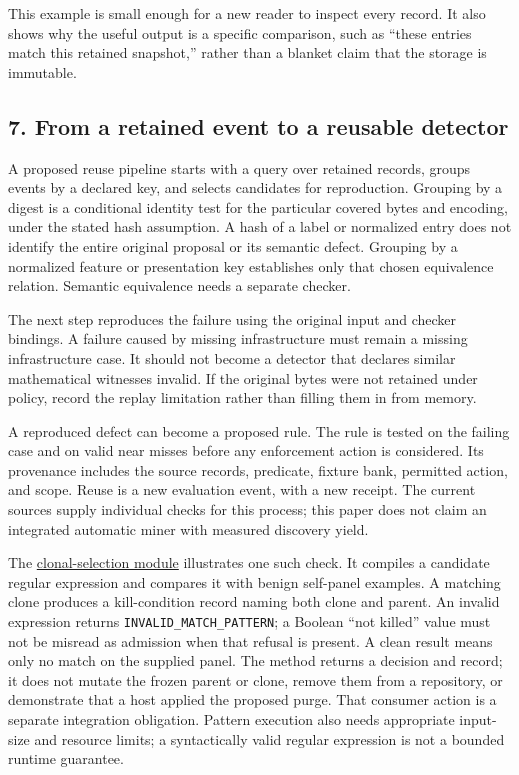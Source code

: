 \documentclass[
  11pt,
]{article}
\begin{document}
This example is small enough for a new reader to inspect every record.
It also shows why the useful output is a specific comparison, such as
``these entries match this retained snapshot,'' rather than a blanket
claim that the storage is immutable.

\hypertarget{from-a-retained-event-to-a-reusable-detector}{%
\subsection{7. From a retained event to a reusable
detector}\label{from-a-retained-event-to-a-reusable-detector}}

A proposed reuse pipeline starts with a query over retained records,
groups events by a declared key, and selects candidates for
reproduction. Grouping by a digest is a conditional identity test for
the particular covered bytes and encoding, under the stated hash
assumption. A hash of a label or normalized entry does not identify the
entire original proposal or its semantic defect. Grouping by a
normalized feature or presentation key establishes only that chosen
equivalence relation. Semantic equivalence needs a separate checker.

The next step reproduces the failure using the original input and
checker bindings. A failure caused by missing infrastructure must remain
a missing infrastructure case. It should not become a detector that
declares similar mathematical witnesses invalid. If the original bytes
were not retained under policy, record the replay limitation rather than
filling them in from memory.

A reproduced defect can become a proposed rule. The rule is tested on
the failing case and on valid near misses before any enforcement action
is considered. Its provenance includes the source records, predicate,
fixture bank, permitted action, and scope. Reuse is a new evaluation
event, with a new receipt. The current sources supply individual checks
for this process; this paper does not claim an integrated automatic
miner with measured discovery yield.

The
\href{https://github.com/dbccpage/the_symbol_game/blob/52cb5457f6c485ba548cfd292f6012a941ed22cf/symbol_game/domain/immune/clonal_selection.py}{clonal-selection
module} illustrates one such check. It compiles a candidate regular
expression and compares it with benign self-panel examples. A matching
clone produces a kill-condition record naming both clone and parent. An
invalid expression returns
\texttt{\nolinkurl{INVALID_MATCH_PATTERN}}; a Boolean ``not
killed'' value must not be misread as admission when that refusal is
present. A clean result means only no match on the supplied panel. The
method returns a decision and record; it does not mutate the frozen
parent or clone, remove them from a repository, or demonstrate that a
host applied the proposed purge. That consumer action is a separate
integration obligation. Pattern execution also needs appropriate
input-size and resource limits; a syntactically valid regular expression
is not a bounded runtime guarantee.
\end{document}
